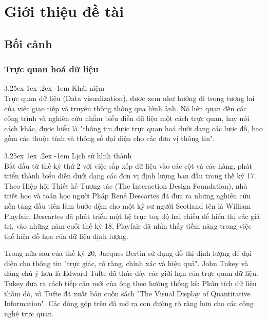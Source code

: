 \documentclass[12pt,a4paper]{article}
\makeatletter
\newcommand*\NewPage{\newpage\null\thispagestyle{empty}\newpage}
\newcommand{\myparagraph}[1]{\paragraph{#1}\mbox{}\\} %
\renewcommand\paragraph{\@startsection{paragraph}{5}{\z@}%
  {3.25ex \@plus1ex \@minus.2ex}%
  {-1em}%
  {\normalfont\normalsize\bfseries}}
\makeatother
\begin{document}


\thispagestyle{empty}
\NewPage
{} %
\tableofcontents
\NewPage
\listoffigures %
\clearpage
\listoftables
\clearpage
{}
\lstlistoflistings
\clearpage
{} %
\section{Giới thiệu đề tài}
\subsection{Bối cảnh}
\subsubsection{Trực quan hoá dữ liệu}
\myparagraph{Khái niệm}
Trực quan dữ liệu (Data visualization), được xem như hướng đi trong tương lai của việc giao tiếp và truyền thông thông qua hình ảnh. Nó liên quan đến các công trình và nghiên cứu nhằm biểu diễn dữ liệu một cách trực quan, hay nói cách khác, được hiểu là "thông tin được trực quan hoá dưới dạng các lược đồ, bao gồm các thuộc tính và thông số đại diện cho các đơn vị thông tin\cite{dataviz_wiki}".

\myparagraph{Lịch sử hình thành}
Bắt đầu từ thế kỷ thứ 2 với việc sắp xếp dữ liệu vào các cột và các hàng, phát triển thành biểu diễn dưới dạng các đơn vị định lượng ban đầu trong thế kỷ 17\cite{wiki_history_1}. Theo Hiệp hội Thiết kế Tương tác (The Interaction Design Foundation), nhà triết học và toán học người Pháp René Descartes đã đưa ra những nghiên cứu nền tảng đầu tiên làm bước đệm cho một kỹ sư người Scotland tên là William Playfair. Descartes đã phát triển một hệ trục toạ độ hai chiều để hiển thị các giá trị, vào những năm cuối thế kỷ 18, Playfair đã nhìn thấy tiềm năng trong việc thể hiện đồ họa của dữ liệu định lượng\cite{wiki_history_1}.

Trong nửa sau của thế kỷ 20, Jacques Bertin sử dụng đồ thị định lượng để đại diện cho thông tin "trực giác, rõ ràng, chính xác và hiệu quả". \cite{wiki_history_1} John Tukey và đáng chú ý hơn là Edward Tufte đã thúc đẩy các giới hạn của trực quan dữ liệu. Tukey đưa ra cách tiếp cận mới của ông theo hướng thống kê: Phân tích dữ liệu thăm dò, và Tufte đã xuất bản cuốn sách "The Visual Display of Quantitative Information". Các đóng góp trên đã mở ra con đường rõ ràng hơn cho các công nghệ trực quan.
\end{document}

